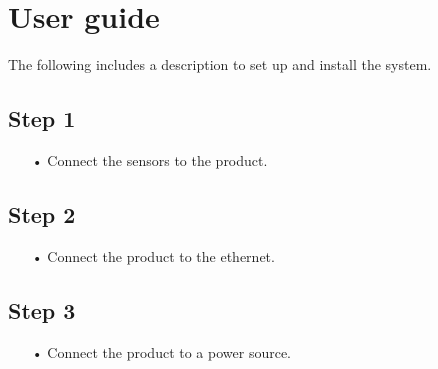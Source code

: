 \section{User guide}
The following includes a description to set up and install the system.
\subsection*{Step 1}
\begin{enumerate}
	\item[•]Connect the sensors to the product.
\end{enumerate}
\subsection*{Step 2}
\begin{enumerate}
	\item[•]Connect the product to the ethernet.
\end{enumerate}
\subsection*{Step 3}
\begin{enumerate}
	\item[•]Connect the product to a power source.  
\end{enumerate}